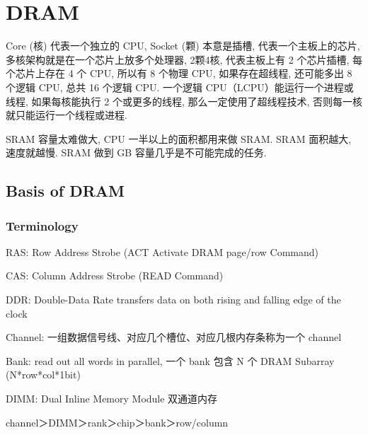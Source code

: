 \documentclass[UTF8,12pt,a4paper]{article}
\begin{document}
\section{DRAM}
Core (核) 代表一个独立的 CPU, Socket (颗) 本意是插槽,
代表一个主板上的芯片, 多核架构就是在一个芯片上放多个处理器,
2颗4核, 代表主板上有 2 个芯片插槽, 每个芯片上存在 4 个 CPU, 所以有 8 个物理 CPU,
如果存在超线程, 还可能多出 8 个逻辑 CPU, 总共 16 个逻辑 CPU.
一个逻辑 CPU（LCPU）能运行一个进程或线程, 如果每核能执行 2 个或更多的线程,
那么一定使用了超线程技术, 否则每一核就只能运行一个线程或进程.

SRAM 容量太难做大, CPU 一半以上的面积都用来做 SRAM.
SRAM 面积越大, 速度就越慢.
SRAM 做到 GB 容量几乎是不可能完成的任务.

\subsection{Basis of DRAM}
\subsubsection{Terminology}
\begin{compactitem}
  \item RAS: Row Address Strobe (ACT Activate DRAM page/row Command)
  \item CAS: Column Address Strobe (READ Command)
  \item DDR: Double-Data Rate transfers data
  on both rising and falling edge of the clock
  \item Channel: 一组数据信号线、对应几个槽位、对应几根内存条称为一个 channel
  \item Bank: read out all words in parallel, 一个 bank 包含 N 个 DRAM Subarray (N*row*col*1bit)
  \item DIMM: Dual Inline Memory Module 双通道内存
  \item channel＞DIMM＞rank＞chip＞bank＞row/column
\end{compactitem}
\end{document}
